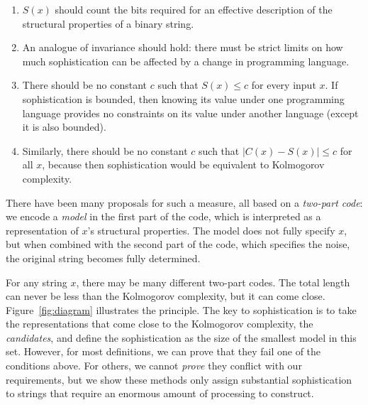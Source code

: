\documentclass{style/llncs}
\begin{document}
\begin{enumerate}
\item $S(x)$ should count the bits required for an effective description of the structural properties of a binary string.
\item An analogue of invariance should hold: there must be strict limits on how much sophistication can be affected by a change in programming language.
\item There should be no constant $c$ such that $S(x)\le c$ for every input $x$. If sophistication is bounded, then knowing its value under one programming language provides no constraints on its value under another language (except it is also bounded). 
\item Similarly, there should be no constant $c$ such that $\left | C(x)-S(x)\right |\le c$ for all $x$, because then sophistication would be equivalent to Kolmogorov complexity. 
\end{enumerate}
There have been many proposals for such a measure, all based on a \emph{two-part code}: we encode a \emph{model} in the first part of the code, which is interpreted as a representation of $x$'s structural properties. The model does not fully specify $x$, but when combined with the second part of the code, which specifies the noise, the original string becomes fully determined.\footnotemark


For any string $x$, there may be many different two-part codes. The total length can never be less than the Kolmogorov complexity, but it can come close. Figure~\ref{fig:diagram} illustrates the principle. The key to sophistication is to take the representations that come close to the Kolmogorov complexity, the \emph{candidates}, and define the sophistication as the size of the smallest model in this set. However, for most definitions, we can prove that they fail one of the conditions above. For others, we cannot \emph{prove} they conflict with our requirements, but we show these methods only assign substantial sophistication to strings that require an enormous amount of processing to construct. 
\end{document}
